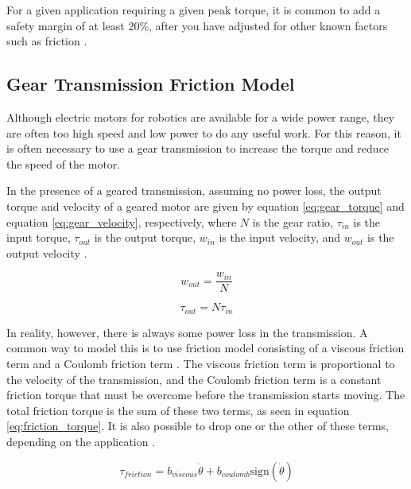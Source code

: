     For a given application requiring a given peak torque, it is common to add a safety margin of at least 20\%, after you have adjusted for other known factors such as friction \cite{Microchip_BLDC}.

\subsection{Gear Transmission Friction Model}

    Although electric motors for robotics are available for a wide power range, they are often too high speed and low power to do any useful work. For this reason, it is often necessary to use a gear transmission to increase the torque and reduce the speed of the motor. 

    In the presence of a geared transmission, assuming no power loss, the output torque and velocity of a geared motor are given by equation \ref{eq:gear_torque} and equation \ref{eq:gear_velocity}, respectively, where $N$ is the gear ratio, $\tau_{in}$ is the input torque, $\tau_{out}$ is the output torque, $w_{in}$ is the input velocity, and $w_{out}$ is the output velocity \cite{modern_robotics_book}.

    \begin{equation}
        \label{eq:gear_torque}
        w_ {out} = \frac{w_{in}}{N}
    \end{equation}

    \begin{equation}
        \label{eq:gear_velocity}
        \tau_{out} = N\tau_{in}
    \end{equation}

    In reality, however, there is always some power loss in the transmission. A common way to model this is to use friction model consisting of a viscous friction term and a Coulomb friction term \cite{modern_robotics_book}. The viscous friction term is proportional to the velocity of the transmission, and the Coulomb friction term is a constant friction torque that must be overcome before the transmission starts moving. The total friction torque is the sum of these two terms, as seen in equation \ref{eq:friction_torque}. It is also possible to drop one or the other of these terms, depending on the application \cite{modern_robotics_book}.

    \begin{equation}
        \label{eq:friction_torque}
        \tau_{friction} = b_{viscous}\dot{\theta} + b_{coulomb}\text{sign}(\dot{\theta})  
    \end{equation}

